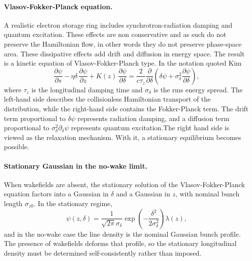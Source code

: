 \documentclass[11pt,a4paper]{article}
\begin{document}
\begin{sloppypar}
\paragraph{Vlasov-Fokker-Planck equation.}
A realistic electron storage ring includes synchrotron-radiation damping and quantum excitation. These effects are non conservative and as such do not preserve the Hamiltonian flow, in other words they do not preserve phase-space area. These dissipative effects add drift and diffusion in energy space. The result is a kinetic equation of Vlasov-Fokker-Planck type. In the notation quoted Kim \cite{kim_mbtrack2_cuda_2025}
\begin{equation}
\frac{\partial \psi}{\partial s}
-
\eta\delta\,\frac{\partial \psi}{\partial z}
+
K(z)\,\frac{\partial \psi}{\partial \delta}
=
\frac{2}{c\tau_z}
\frac{\partial}{\partial \delta}
\left(
\delta\psi+\sigma_\delta^2\frac{\partial \psi}{\partial \delta}
\right),
\label{eq:VFP}
\end{equation}
where $\tau_z$ is the longitudinal damping time and $\sigma_\delta$ is the rms energy spread. The left-hand side describes the collisionless Hamiltonian transport of the distribution, while the right-hand side contains the Fokker-Planck term. The drift term proportional to $\delta\psi$ represents radiation damping, and a diffusion term proportional to $\sigma_\delta^2 \partial_\delta \psi$ represents quantum excitation.The right hand side is viewed as the relaxation mechanism. With it, a stationary equilibrium becomes possible. 

\paragraph{Stationary Gaussian in the no-wake limit.}
When wakefields are absent, the stationary solution of the Vlasov-Fokker-Planck equation factors into a Gaussian in $\delta$ and a Gaussian in $z$, with nominal bunch length $\sigma_{z0}$. In the stationary regime,
\begin{equation}
\psi(z,\delta)
=
\frac{1}{\sqrt{2\pi}\sigma_\delta}
\exp\!\left(-\frac{\delta^2}{2\sigma_\delta^2}\right)\lambda(z),
\label{eq:gauss_factor}
\end{equation}
and in the no-wake case the line density is the nominal Gaussian bunch profile. The presence of wakefields deforms that profile, so the stationary longitudinal density must be determined self-consistently rather than imposed. 


\end{sloppypar}
\end{document}
